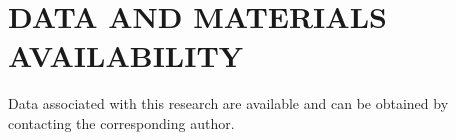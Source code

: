 \section{DATA AND MATERIALS AVAILABILITY}
Data associated with this research are available and can be obtained by contacting the corresponding author.








